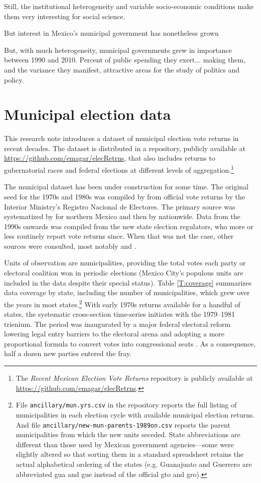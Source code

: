 \documentclass[letter,12pt]{article}
\begin{document}
Still, the institutional heterogeneity and variable socio-economic conditions make them very interesting for social science. 

But interest in Mexico's municipal government has nonetheless grown

But, with much heterogeneity, municipal governments grew in importance between 1990 and 2010. Percent of public spending they exert... making them, and the variance they manifest, attractive areas for the study of politics and policy. 

\section{Municipal election data}
This research note introduces a dataset of municipal election vote returns in recent decades. The dataset is distributed in a repository, publicly available at \url{https://github.com/emagar/elecRetrns}, that also includes returns to gubernatorial races and federal elections at different levels of aggregation.\footnote{The \emph{Recent Mexican Election Vote Returns} repository is publicly available at \url{https://github.com/emagar/elecRetrns}.} 

The municipal dataset has been under construction for some time. The original seed for the 1970s and 1980s was compiled by \citet{molinar.1991a} from official vote returns by the Interior Ministry's Registro Nacional de Electores. The primary source was systematized by \citet{magar.1994} for northern Mexico and then by \citet{varela.2004} nationwide. Data from the 1990s onwards was compiled from the new state election regulators, who more or less routinely report vote returns since. When that was not the case, other sources were consulted, most notably \citet{revista.voz.y.voto} and \citet{cede.uam.izt}.

Units of observation are municipalities, providing the total votes each party or electoral coalition won in periodic elections (Mexico City's populous units are included in the data despite their special status). Table \ref{T:coverage} summarizes data coverage by state, including the number of municipalities, which grew over the years in most states.\footnote{File \verb|ancillary/mun.yrs.csv| in the repository reports the full listing of municipalities in each election cycle with available municipal election returns. And file \verb|ancillary/new-mun-parents-1989on.csv| reports the parent municipalities from which the new units seceded. State abbreviations are different than those used by Mexican government agencies---some were slightly altered so that sorting them in a standard spreadsheet retains the actual alphabetical ordering of the states (e.g. Guanajuato and Guerrero are abbreviated gua and gue instead of the official gto and gro).} With early 1970s returns available for a handful of states, the systematic cross-section time-series initiates with the 1979--1981 trienium. The period was inaugurated by a major federal electoral reform lowering legal entry barriers to the electoral arena and adopting a more proportional formula to convert votes into congressional seats \citep[:116]{molinar.1991a}. As a consequence, half a dozen new parties entered the fray. 
\end{document}
